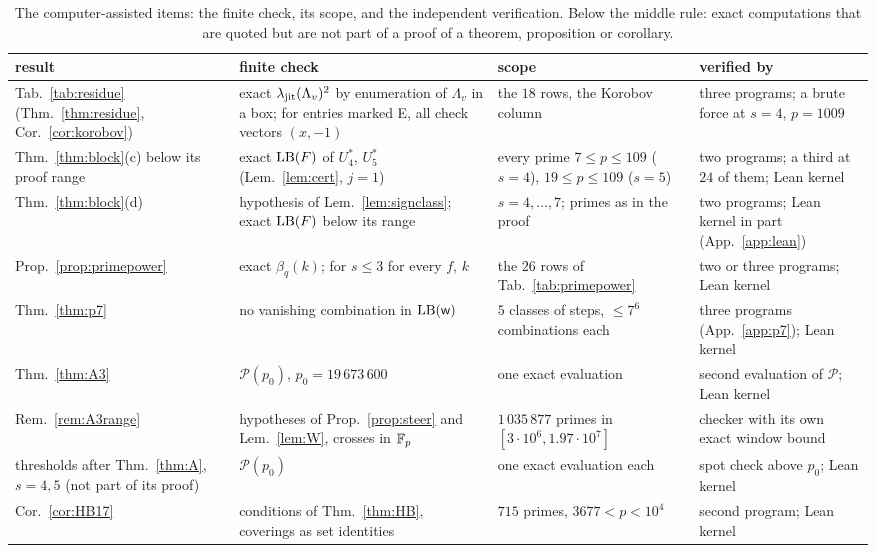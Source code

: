 \begin{table}[tp]
\centering
\footnotesize
\caption{The computer-assisted items: the finite check, its scope, and the independent verification. Below the middle rule: exact computations that are quoted but are not part of a proof of a theorem, proposition or corollary.}
\label{tab:ca}\label{tab:checks}
\setlength{\tabcolsep}{3pt}
\begin{tabular}{@{}>{\raggedright\arraybackslash}p{}>{\raggedright\arraybackslash}p{}>{\raggedright\arraybackslash}p{}>{\raggedright\arraybackslash}p{}@{}}
\toprule
result & finite check & scope & verified by\\
\midrule
Tab.~\ref{tab:residue} (Thm.~\ref{thm:residue}, Cor.~\ref{cor:korobov}) & exact $\lambda_{\mathrm{jit}}(\Lambda_v)^2$ by enumeration of $\Lambda_v$ in a box; for entries marked E, all check vectors $(x,-1)$ & the $18$ rows, the Korobov column & three programs; a brute force at $s=4$, $p=1009$\\
Thm.~\ref{thm:block}(c) below its proof range & exact $\mathrm{LB}(F)$ of $U^*_4$, $U^*_5$ (Lem.~\ref{lem:cert}, $j=1$) & every prime $7\le p\le109$ ($s=4$), $19\le p\le109$ ($s=5$) & two programs; a third at $24$ of them; Lean kernel\\
Thm.~\ref{thm:block}(d) & hypothesis of Lem.~\ref{lem:signclass}; exact $\mathrm{LB}(F)$ below its range & $s=4,\dots,7$; primes as in the proof & two programs; Lean kernel in part (App.~\ref{app:lean})\\
Prop.~\ref{prop:primepower} & exact $\beta_q(k)$; for $s\le3$ for every $f$, $k$ & the $26$ rows of Tab.~\ref{tab:primepower} & two or three programs; Lean kernel\\
Thm.~\ref{thm:p7} & no vanishing combination in $\mathrm{LB}(\mathsf w)$ & $5$ classes of steps, $\le7^6$ combinations each & three programs (App.~\ref{app:p7}); Lean kernel\\
Thm.~\ref{thm:A3} & $\mathcal P(p_0)$, $p_0=19\,673\,600$ & one exact evaluation & second evaluation of $\mathcal P$; Lean kernel\\
Rem.~\ref{rem:A3range} & hypotheses of Prop.~\ref{prop:steer} and Lem.~\ref{lem:W}, crosses in $\mathbb{F}_p$ & $1\,035\,877$ primes in $[3\cdot10^6,1.97\cdot10^7]$ & checker with its own exact window bound\\
thresholds after Thm.~\ref{thm:A}, $s=4,5$ (not part of its proof) & $\mathcal P(p_0)$ & one exact evaluation each & spot check above $p_0$; Lean kernel\\
Cor.~\ref{cor:HB17} & conditions of Thm.~\ref{thm:HB}, coverings as set identities & $715$ primes, $3677<p<10^4$ & second program; Lean kernel\\

\end{tabular}
\end{table}
